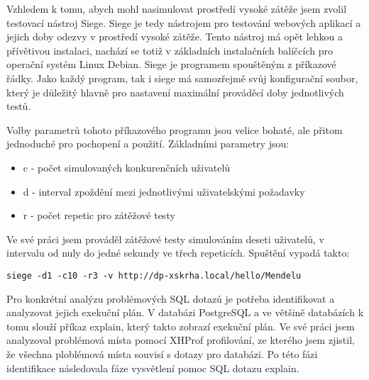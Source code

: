 \documentclass[12pt]{article}
\begin{document}
Vzhledem k tomu, abych mohl nasimulovat prostředí vysoké zátěže jsem zvolil testovací nástroj Siege. Siege je tedy nástrojem pro testování webových aplikací a jejich doby odezvy v prostředí vysoké zátěže. Tento nástroj má opět lehkou a přívětivou instalaci, nachází se totiž v základních instalačních balíčcích pro operační systém Linux Debian. Siege je programem spouštěným z příkazové řádky. Jako každý program, tak i siege má samozřejmě svůj konfigurační soubor, který je důležitý hlavně pro nastavení maximální prováděcí doby jednotlivých testů.

Volby parametrů tohoto příkazového programu jsou velice bohaté, ale přitom jednoduché pro pochopení a použití. Základními parametry jsou:

\begin{itemize}
\item c - počet simulovaných konkurenčních uživatelů
\item d - interval zpoždění mezi jednotlivými uživatelskými požadavky
\item r - počet repetic pro zátěžové testy
\end{itemize}

Ve své práci jsem prováděl zátěžové testy simulováním deseti uživatelů, v intervalu od nuly do jedné sekundy ve třech repeticích. Spuštění vypadá takto:
\begin{scriptsize}
\begin{verbatim}
siege -d1 -c10 -r3 -v http://dp-xskrha.local/hello/Mendelu
\end{verbatim}
\end{scriptsize}


Pro konkrétní analýzu problémových SQL dotazů je potřeba identifikovat a analyzovat jejich exekuční plán. V databázi PostgreSQL a ve většině databázích k tomu slouží příkaz explain, který takto zobrazí exekuční plán. Ve své práci jsem analyzoval problémová místa pomocí XHProf profilování, ze kterého jsem zjistil, že všechna ploblémová místa souvisí s dotazy pro databázi. Po této fázi identifikace následovala fáze vysvětlení pomoc SQL dotazu explain.
\end{document}
